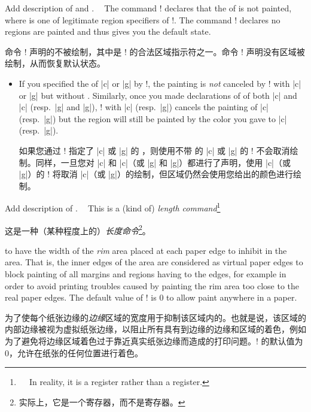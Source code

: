 \begin{description}


\item[\Midx{\!\nobackgroundcolor!}\marg{region}]\mbox{}
\Item[\Midx{\!\resetbackgroundcolor!}]\mbox{}\par
{}
{Add description of  and
    .}

The command \!\nobackgroundcolor! declares that the \bground{} of
 is not painted, where  is one of legitimate
region specifiers of \!\backgroundcolor!.  The command
\!\resetbackgroundcolor! declares no regions are painted and thus gives
you the default state.

命令 \!\nobackgroundcolor! 声明的\bground{}不被绘制，其中是 \!\backgroundcolor! 的合法区域指示符之一。命令 \!\resetbackgroundcolor! 声明没有区域被绘制，从而恢复默认状态。

\begin{itemize}
\item
If you specified the \bgpaint{} of |c| or |g| by
\!\backgroundcolor!, the painting is \emph{not} canceled by
\!\nobackgroundcolor! with |c| or |g| but without .  Similarly,
once you made declarations of \bgpaint{} of both |c| and |c|
(resp.\ |g| and |g|), \!\nobackgroundcolor! with |c|
(resp.\ |g|) cancels the painting of |c| (resp.\
|g|) but the region will still be painted by the color you gave
to |c| (resp.\ |g|).

如果您通过 \!\backgroundcolor! 指定了 |c| 或 |g| 的 \bgpaint{}，则使用不带  的 |c| 或 |g| 的 \!\nobackgroundcolor! 不会取消绘制。同样，一旦您对 |c| 和 |c|（或 |g| 和 |g|）都进行了声明，使用 |c|（或 |g|）的 \!\nobackgroundcolor! 将取消 |c|（或 |g|）的绘制，但区域仍然会使用您给出的颜色进行绘制。
\end{itemize}



\item[\Midx{\!\pagerim!}]\mbox{}\par
{}
{Add description of .}

This is a (kind of) \emph{length command}\footnote{

In reality, it is a  register rather than a  register.}

这是一种（某种程度上的）\emph{长度命令}\footnote{实际上，它是一个寄存器，而不是寄存器。}。

to have the width of the \emph{rim} area placed at each paper edge to 
inhibit \bgpaint{} in the area.  That is, the inner edges of the area are
considered as virtual paper edges to block painting of all margins and
regions having \bginfext{} to the edges, for example in order to
avoid printing troubles caused by painting the rim area too close to the
real paper edges.  The default value of \!\pagerim! is 0 to allow paint
anywhere in a paper.

为了使每个纸张边缘的\emph{边缘}区域的宽度用于抑制该区域内的\bgpaint{}。也就是说，该区域的内部边缘被视为虚拟纸张边缘，以阻止所有具有\bginfext{}到边缘的边缘和区域的着色，例如为了避免将边缘区域着色过于靠近真实纸张边缘而造成的打印问题。\!\pagerim! 的默认值为 0，允许在纸张的任何位置进行着色。
\end{description}
